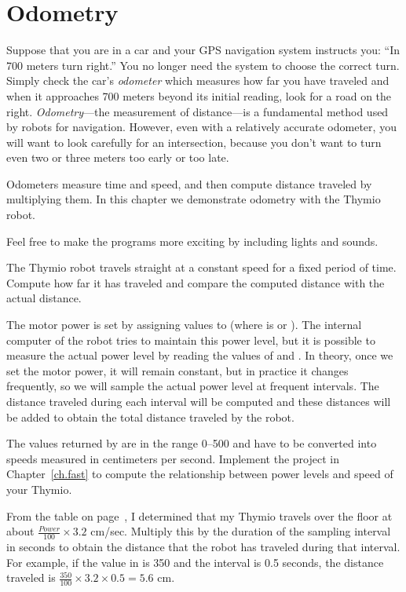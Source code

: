 \chapter{Odometry}\label{ch.odo}

Suppose that you are in a car and your GPS navigation system
instructs you: ``In 700 meters turn right.'' You no longer need the
system to choose the correct turn. Simply check the car's
\emph{odometer} which measures how far you have traveled and when it
approaches 700 meters beyond its initial reading, look for a road
on the right. \emph{Odometry}---the measurement of distance---is a
fundamental method used by robots for navigation.
However, even with a relatively accurate odometer, you will
want to look carefully for an intersection, because you don't want to
turn even two or three meters too early or too late.

Odometers measure time and speed,
and then compute distance traveled by multiplying them. In
this chapter we demonstrate odometry with the Thymio robot.

Feel free to make the programs more exciting by including lights
and sounds.


The Thymio robot travels straight at a constant speed for a fixed
period of time. Compute how far it has traveled and compare the
computed distance with the actual distance.


The motor power is set by assigning values to
 (where  is  or ). The internal
computer of the robot tries to maintain this power level, but it is
possible to measure the actual power level by reading the values of
 and . In theory, once we set
the motor power, it will remain constant, but in practice it changes
frequently, so we will sample the actual power level at frequent
intervals. The distance traveled during each interval will be computed
and these distances will be added to obtain the total distance
traveled by the robot.

The values returned by  are in the range 0--500 and
have to be converted into speeds measured in centimeters per second.
Implement the project in Chapter~\ref{ch.fast}
to compute the relationship between
power levels and speed of your Thymio.

From the table on page~\pageref{tab.speed},
I determined that my Thymio travels over the floor
at about $\frac{\mathit{Power}}{100}\times 3.2$ cm/sec. Multiply this by
the duration of the sampling interval in seconds to obtain the distance
that the robot has traveled during that interval. For example, if the
value in  is 350 and the interval is 0.5 seconds,
the distance traveled is $\frac{350}{100}\times 3.2 \times 0.5 = 5.6$ cm.

